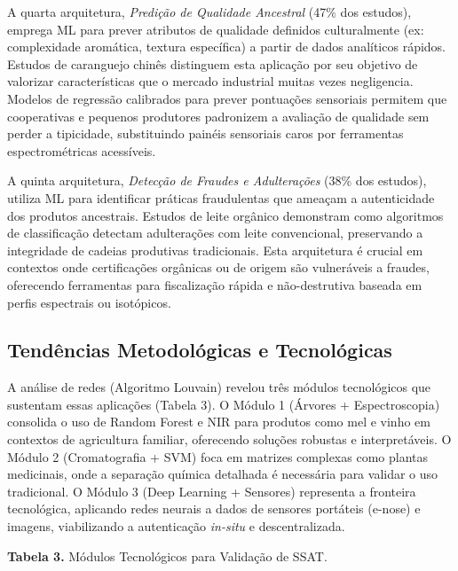 A quarta arquitetura, \textit{Predição de Qualidade Ancestral} (47\% dos estudos), emprega ML para prever atributos de qualidade definidos culturalmente (ex: complexidade aromática, textura específica) a partir de dados analíticos rápidos. Estudos de caranguejo chinês distinguem esta aplicação por seu objetivo de valorizar características que o mercado industrial muitas vezes negligencia. Modelos de regressão calibrados para prever pontuações sensoriais permitem que cooperativas e pequenos produtores padronizem a avaliação de qualidade sem perder a tipicidade, substituindo painéis sensoriais caros por ferramentas espectrométricas acessíveis.

A quinta arquitetura, \textit{Detecção de Fraudes e Adulterações} (38\% dos estudos), utiliza ML para identificar práticas fraudulentas que ameaçam a autenticidade dos produtos ancestrais. Estudos de leite orgânico demonstram como algoritmos de classificação detectam adulterações com leite convencional, preservando a integridade de cadeias produtivas tradicionais. Esta arquitetura é crucial em contextos onde certificações orgânicas ou de origem são vulneráveis a fraudes, oferecendo ferramentas para fiscalização rápida e não-destrutiva baseada em perfis espectrais ou isotópicos.

\subsection{Tendências Metodológicas e Tecnológicas}

A análise de redes (Algoritmo Louvain) revelou três módulos tecnológicos que sustentam essas aplicações (Tabela 3). O Módulo 1 (Árvores + Espectroscopia) consolida o uso de Random Forest e NIR para produtos como mel e vinho em contextos de agricultura familiar, oferecendo soluções robustas e interpretáveis. O Módulo 2 (Cromatografia + SVM) foca em matrizes complexas como plantas medicinais, onde a separação química detalhada é necessária para validar o uso tradicional. O Módulo 3 (Deep Learning + Sensores) representa a fronteira tecnológica, aplicando redes neurais a dados de sensores portáteis (e-nose) e imagens, viabilizando a autenticação \emph{in-situ} e descentralizada.

\textbf{Tabela 3.} Módulos Tecnológicos para Validação de SSAT.

